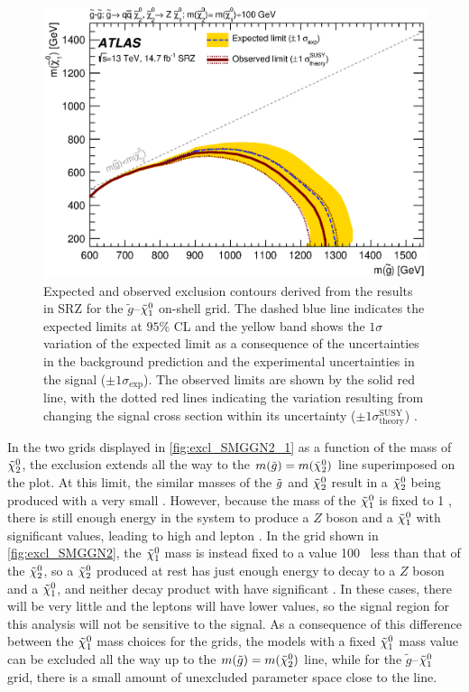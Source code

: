 \begin{figure}[!htb]
\centering
\includegraphics[width=.8\textwidth]{figures/interpretation/excl_SM_GG_N2.eps}
\caption{
Expected and observed exclusion contours derived from the results in SRZ for the $\tilde{g}$--$\tilde{\chi}_1^0$ on-shell grid. 
The dashed blue line indicates the expected limits at $95\%$ CL and the yellow band shows the $1\sigma$ variation of the expected limit as a consequence of the uncertainties in the background prediction and the experimental uncertainties in the signal ($\pm1\sigma_\text{exp}$). 
The observed limits are shown by the solid red line, with the dotted red lines indicating the variation resulting from changing the signal cross section within its uncertainty ($\pm1\sigma^\text{SUSY}_\text{theory}$) \cite{this_paper}.
\label{fig:excl_SMGGN2}
}
\end{figure}

In the two grids displayed in \autoref{fig:excl_SMGGN2_1} as a function of the mass of $\tilde{\chi}_2^0$, the exclusion extends all the way to the $m({\tilde g}) = m(\tilde{\chi}^{0}_{2})$ line superimposed on the plot. At this limit, the similar masses of the ${\tilde g}$ and $\tilde{\chi}_2^0$ result in a $\tilde{\chi}_2^0$ being produced with a very small \pt. However, because the mass of the $\tilde{\chi}_1^0$ is fixed to 1 \gev, there is still enough energy in the system to produce a $Z$ boson and a $\tilde{\chi}_1^0$ with significant \pt values, leading to high \met and lepton \pt. In the grid shown in \autoref{fig:excl_SMGGN2}, the $\tilde{\chi}_1^0$ mass is instead fixed to a value 100 \gev~less than that of the $\tilde{\chi}_2^0$, so a $\tilde{\chi}_2^0$ produced at rest has just enough energy to decay to a $Z$ boson and a $\tilde{\chi}_1^0$, and neither decay product with have significant \pt. In these cases, there will be very little \met and the leptons will have lower \pt values, so the signal region for this analysis will not be sensitive to the signal. As a consequence of this difference between the $\tilde{\chi}_1^0$ mass choices for the grids, the models with a fixed $\tilde{\chi}_1^0$ mass value can be excluded all the way up to the $m({\tilde g}) = m(\tilde{\chi}^{0}_{2})$ line, while for the $\tilde{g}$--$\tilde{\chi}_1^0$ grid, there is a small amount of unexcluded parameter space close to the line.

